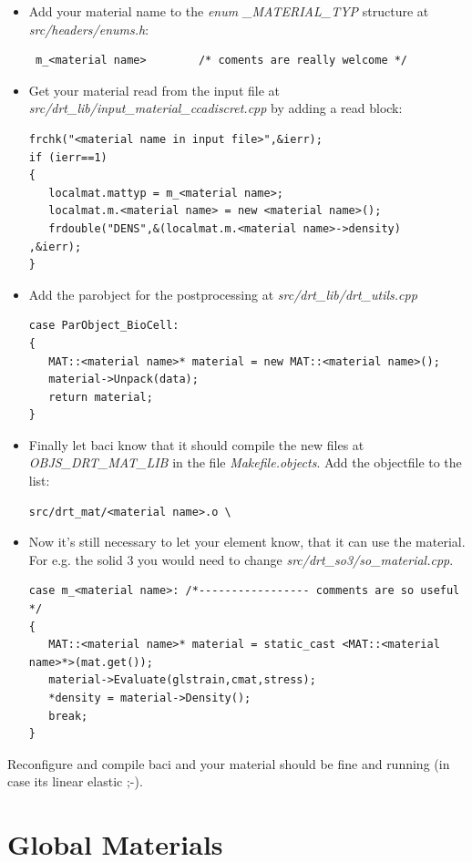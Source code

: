 \begin{itemize}
\item Add your material name to the \textit{enum \_MATERIAL\_TYP} structure at \textit{src/headers/enums.h}:
\begin{verbatim}
 m_<material name>        /* coments are really welcome */
\end{verbatim}

\item Get your material read from the input file at \textit{src/drt\_lib/input\_material\_ccadiscret.cpp} by adding a read block:
\begin{verbatim}
frchk("<material name in input file>",&ierr);
if (ierr==1)
{
   localmat.mattyp = m_<material name>;
   localmat.m.<material name> = new <material name>();
   frdouble("DENS",&(localmat.m.<material name>->density)        ,&ierr);
}
\end{verbatim}

\item Add the parobject for the postprocessing at \textit{src/drt\_lib/drt\_utils.cpp}
\begin{verbatim}
case ParObject_BioCell:
{
   MAT::<material name>* material = new MAT::<material name>();
   material->Unpack(data);
   return material;
}
\end{verbatim}

\item Finally let baci know that it should compile the new files at \textit{OBJS\_DRT\_MAT\_LIB} in the file \textit{Makefile.objects}. Add the objectfile to the list:
\begin{verbatim}
src/drt_mat/<material name>.o \
\end{verbatim}

\item Now it's still necessary to let your element know, that it can use the material. For e.g. the solid 3 you would need to change \textit{src/drt\_so3/so\_material.cpp}.
\begin{verbatim}
case m_<material name>: /*----------------- comments are so useful */
{
   MAT::<material name>* material = static_cast <MAT::<material name>*>(mat.get());
   material->Evaluate(glstrain,cmat,stress);
   *density = material->Density();
   break;
}
\end{verbatim}

\end{itemize}

Reconfigure and compile baci and your material should be fine and running (in case its linear elastic ;-).


\section{Global Materials}

